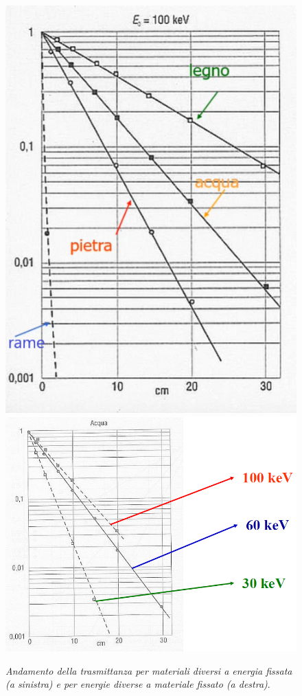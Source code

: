 \documentclass{report}
\numberwithin{equation}{section}
\numberwithin{figure}{section}
\begin{document}
\begin{figure}[htp]
\centering
\includegraphics[scale=0.467]{immagini/trasmittanza.png}\quad\includegraphics[scale=0.62]{immagini/trasmittanza2.png}
\caption{\label{fig:trasmittanza} \textit{Andamento della trasmittanza per materiali diversi a energia fissata (a sinistra) e per energie diverse a materiale fissato (a destra)}.}
\end{figure}
\end{document}
